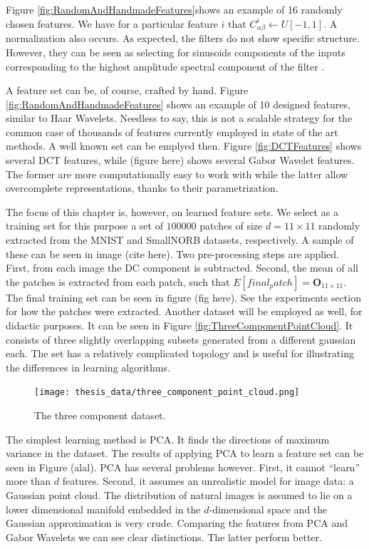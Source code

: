 \documentclass[12pt,a4paper,oneside,english]{UPBThesis}
\newcommand{\hctimes}[2]{{#1}\!\times\!{#2}}
\begin{document}
Figure \ref{fig:RandomAndHandmadeFeatures}shows an example of 16 randomly chosen features. We have for a particular feature $i$ that $C^i_{\alpha\beta} \leftarrow U[-1,1]$. A normalization also occurs. As expected, the filters do not show specific structure. However, they can be seen as selecting for sinusoids components of the inputs corresponding to the highest amplitude spectral component of the filter \cite{random-weights-feature-learning}.

A feature set can be, of course, crafted by hand. Figure \ref{fig:RandomAndHandmadeFeatures} shows an example of 10 designed features, similar to Haar Wavelets. Needless to say, this is not a scalable strategy for the common case of thousands of features currently employed in state of the art methods. A well known set can be emplyed then. Figure \ref{fig:DCTFeatures} shows several DCT features, while (figure here) shows several Gabor Wavelet features. The former are more computationally easy to work with while the latter allow overcomplete representations, thanks to their parametrization.

The focus of this chapter is, however, on learned feature sets. We select as a training set for this purpose a set of $100000$ patches of size $d = \hctimes{11}{11}$ randomly extracted from the MNIST and SmallNORB datasets, respectively. A sample of these can be seen in image (cite here). Two pre-processing steps are applied. First, from each image the DC component is subtracted. Second, the mean of all the patches is extracted from each patch, such that $E[final_patch] = \textbf{O}_{\hctimes{11}{11}}$. The final training set can be seen in figure (fig here). See the experiments section for how the patches were extracted. Another dataset will be employed as well, for didactic purposes. It can be seen in Figure \ref{fig:ThreeComponentPointCloud}. It consists of three slightly overlapping subsets generated from a different gaussian each. The set has a relatively complicated topology and is useful for illustrating the differences in learning algorithms.

\begin{figure}
\centering
\texttt{[image: thesis\_data/three\_component\_point\_cloud.png]}
\caption{The three component dataset.}
\label{fig:ThreeComponentPointColud}
\end{figure}

The simplest learning method is PCA. It finds the directions of maximum variance in the dataset. The results of applying PCA to learn a feature set can be seen in Figure (alal). PCA has several problems however. First, it cannot ``learn'' more than $d$ features. Second, it assumes an unrealistic model for image data: a Gaussian point cloud. The distribution of natural images is assumed to lie on a lower dimensional manifold embedded in the $d$-dimensional space and the Gaussian approximation is very crude. Comparing the features from PCA and Gabor Wavelets we can see clear distinctions. The latter perform better.
\end{document}
